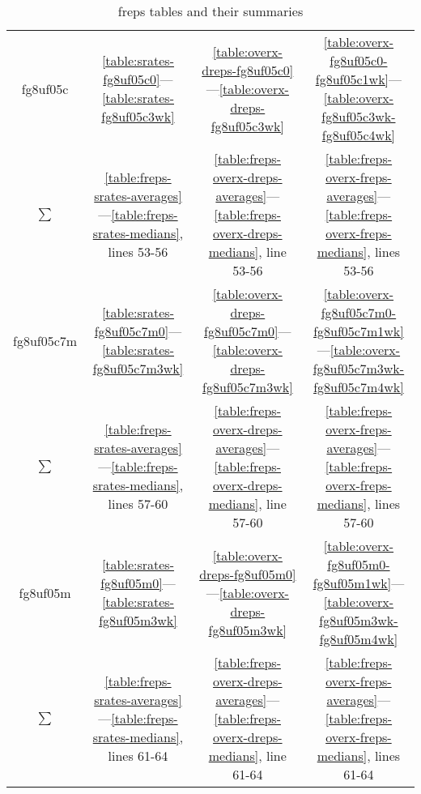 \begin{table}
\begin{tabular}{|cccc|}
\hline
fg8uf05c & \ref{table:srates-fg8uf05c0}—\ref{table:srates-fg8uf05c3wk} & \ref{table:overx-dreps-fg8uf05c0}—\ref{table:overx-dreps-fg8uf05c3wk} & \ref{table:overx-fg8uf05c0-fg8uf05c1wk}—\ref{table:overx-fg8uf05c3wk-fg8uf05c4wk} \\
$\sum$ & \ref{table:freps-srates-averages}—\ref{table:freps-srates-medians}, lines 53-56 & \ref{table:freps-overx-dreps-averages}—\ref{table:freps-overx-dreps-medians}, line 53-56 & \ref{table:freps-overx-freps-averages}—\ref{table:freps-overx-freps-medians}, lines 53-56  \\
\hline
fg8uf05c7m & \ref{table:srates-fg8uf05c7m0}—\ref{table:srates-fg8uf05c7m3wk} & \ref{table:overx-dreps-fg8uf05c7m0}—\ref{table:overx-dreps-fg8uf05c7m3wk} & \ref{table:overx-fg8uf05c7m0-fg8uf05c7m1wk}—\ref{table:overx-fg8uf05c7m3wk-fg8uf05c7m4wk} \\
$\sum$ & \ref{table:freps-srates-averages}—\ref{table:freps-srates-medians}, lines 57-60 & \ref{table:freps-overx-dreps-averages}—\ref{table:freps-overx-dreps-medians}, line 57-60 & \ref{table:freps-overx-freps-averages}—\ref{table:freps-overx-freps-medians}, lines 57-60  \\
\hline
fg8uf05m & \ref{table:srates-fg8uf05m0}—\ref{table:srates-fg8uf05m3wk} & \ref{table:overx-dreps-fg8uf05m0}—\ref{table:overx-dreps-fg8uf05m3wk} & \ref{table:overx-fg8uf05m0-fg8uf05m1wk}—\ref{table:overx-fg8uf05m3wk-fg8uf05m4wk} \\
$\sum$ & \ref{table:freps-srates-averages}—\ref{table:freps-srates-medians}, lines 61-64 & \ref{table:freps-overx-dreps-averages}—\ref{table:freps-overx-dreps-medians}, line 61-64 & \ref{table:freps-overx-freps-averages}—\ref{table:freps-overx-freps-medians}, lines 61-64  \\
\hline
\bottomrule
\end{tabular}
\caption{freps tables and their summaries}
\label{table:freps-tables}
\end{table}


